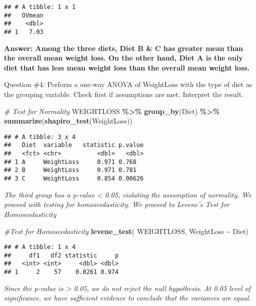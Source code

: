 \documentclass[
]{article}
\newenvironment{Shaded}{\begin{snugshade}}{\end{snugshade}}
\newcommand{\CommentTok}[1]{\textcolor[rgb]{0.56,0.35,0.01}{\textit{#1}}}
\newcommand{\FunctionTok}[1]{\textcolor[rgb]{0.13,0.29,0.53}{\textbf{#1}}}
\newcommand{\NormalTok}[1]{#1}
\newcommand{\SpecialCharTok}[1]{\textcolor[rgb]{0.81,0.36,0.00}{\textbf{#1}}}
\begin{document}
\begin{verbatim}
## # A tibble: 1 x 1
##   OVmean
##    <dbl>
## 1   7.03
\end{verbatim}

\textbf{Answer: Among the three diets, Diet B \& C has greater mean than
the overall mean weight loss. On the other hand, Diet A is the only diet
that has less mean weight loss than the overall mean weight loss.}

Question \#4: Perform a one-way ANOVA of WeightLoss with the type of
diet as the grouping variable. Check first if assumptions are met.
Interpret the result.

\begin{Shaded}
\begin{Highlighting}[]
\CommentTok{\# Test for Normality}
\NormalTok{WEIGHTLOSS }\SpecialCharTok{\%\textgreater{}\%} \FunctionTok{group\_by}\NormalTok{(Diet) }\SpecialCharTok{\%\textgreater{}\%}
  \FunctionTok{summarize}\NormalTok{(}\FunctionTok{shapiro\_test}\NormalTok{(WeightLoss))}
\end{Highlighting}
\end{Shaded}

\begin{verbatim}
## # A tibble: 3 x 4
##   Diet  variable   statistic p.value
##   <fct> <chr>          <dbl>   <dbl>
## 1 A     WeightLoss     0.971 0.768  
## 2 B     WeightLoss     0.971 0.781  
## 3 C     WeightLoss     0.854 0.00626
\end{verbatim}

\emph{The third group has a p-value \textless{} 0.05, violating the
assumption of normality. We proceed with testing for homoscedasticity.
We proceed to Levene's Test for Homoscedasticity}

\begin{Shaded}
\begin{Highlighting}[]
\CommentTok{\#Test for Homoscedasticity}
\FunctionTok{levene\_test}\NormalTok{( WEIGHTLOSS, WeightLoss }\SpecialCharTok{\textasciitilde{}}\NormalTok{ Diet)}
\end{Highlighting}
\end{Shaded}

\begin{verbatim}
## # A tibble: 1 x 4
##     df1   df2 statistic     p
##   <int> <int>     <dbl> <dbl>
## 1     2    57    0.0261 0.974
\end{verbatim}

\emph{Since the p-value is \textgreater{} 0.05, we do not reject the
null hypothesis. At 0.05 level of significance, we have sufficient
evidence to conclude that the variances are equal.}
\end{document}
